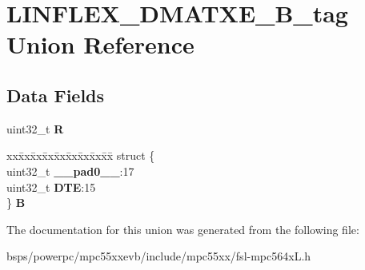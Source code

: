 \hypertarget{unionLINFLEX__DMATXE__32B__tag}{}\section{L\+I\+N\+F\+L\+E\+X\+\_\+\+D\+M\+A\+T\+X\+E\+\_\+B\+\_\+tag Union Reference}
\label{unionLINFLEX__DMATXE__32B__tag}
\subsection*{Data Fields}
\begin{DoxyCompactItemize}
\item 
\mbox{\label{unionLINFLEX__DMATXE__32B__tag_a92a67d5fa1d41bd574158d235c08a719}} 
uint32\+\_\+t {\bfseries R}
\item 
\mbox{\label{unionLINFLEX__DMATXE__32B__tag_a5eaa6d613511c433d1e67b66ed9bd0c4}} 
\begin{tabbing}
xx\=xx\=xx\=xx\=xx\=xx\=xx\=xx\=xx\=\kill
struct \{\\
\>uint32\_t {\bfseries \_\_pad0\_\_}:17\\
\>uint32\_t {\bfseries DTE}:15\\
\} {\bfseries B}\\

\end{tabbing}\end{DoxyCompactItemize}


The documentation for this union was generated from the following file\+:\begin{DoxyCompactItemize}
\item 
bsps/powerpc/mpc55xxevb/include/mpc55xx/fsl-\/mpc564x\+L.\+h\end{DoxyCompactItemize}
